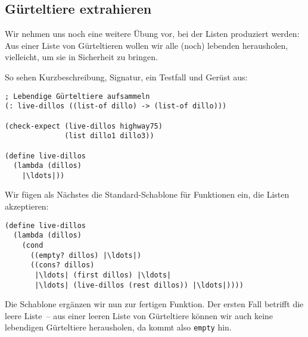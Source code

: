\subsection{Gürteltiere extrahieren}

Wir nehmen uns noch eine weitere Übung vor, bei der Listen produziert
werden: Aus einer Liste von Gürteltieren wollen wir alle (noch)
lebenden herausholen, vielleicht, um sie in Sicherheit zu bringen.

So sehen Kurzbeschreibung, Signatur, ein Testfall und Gerüst aus:
%
\begin{lstlisting}
; Lebendige Gürteltiere aufsammeln
(: live-dillos ((list-of dillo) -> (list-of dillo)))

(check-expect (live-dillos highway75)
              (list dillo1 dillo3))

(define live-dillos
  (lambda (dillos)
    |\ldots|))
\end{lstlisting}
%
Wir fügen als Nächstes die Standard-Schablone für Funktionen ein, die
Listen akzeptieren:
%
\begin{lstlisting}
(define live-dillos
  (lambda (dillos)
    (cond
      ((empty? dillos) |\ldots|)
      ((cons? dillos)
       |\ldots| (first dillos) |\ldots|
       |\ldots| (live-dillos (rest dillos)) |\ldots|))))
\end{lstlisting}
%
Die Schablone ergänzen wir nun zur fertigen Funktion.  Der ersten
Fall betrifft die leere Liste~-- aus einer leeren Liste von
Gürteltiere können wir auch keine lebendigen Gürteltiere herausholen,
da kommt also \lstinline{empty} hin.

